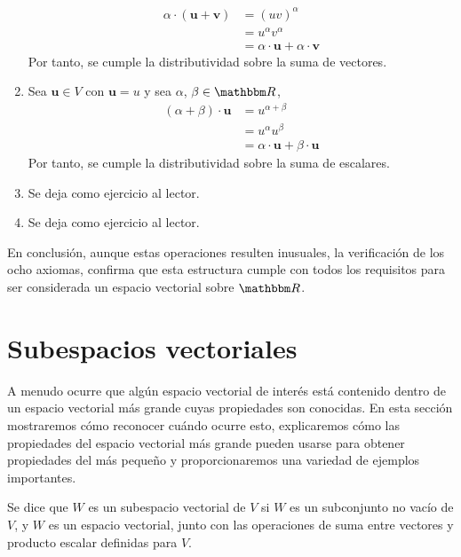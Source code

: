 \begin{examplebox}{}{}
\begin{enumerate}[label=\roman*), topsep=6pt, itemsep=0pt]
\begin{align*}
            \alpha \cdot (\mathbf{u} + \mathbf{v}) & = (uv)^{\alpha} \\
            & = u^{\alpha} v^{\alpha} \\
            & = \alpha \cdot \mathbf{u} + \alpha \cdot \mathbf{v}
        \end{align*}
        Por tanto, se cumple la distributividad sobre la suma de vectores.
        \item Sea $\mathbf{u} \in V$ con $\mathbf{u} = u$ y sea $\alpha$, $\beta \in \RR$,
        \begin{align*}
            (\alpha + \beta) \cdot \mathbf{u} & = u^{\alpha + \beta} \\
            & = u^{\alpha} u^{\beta} \\
            & = \alpha \cdot \mathbf{u} + \beta \cdot \mathbf{u}
        \end{align*}
        Por tanto, se cumple la distributividad sobre la suma de escalares.
        \item Se deja como ejercicio al lector.
        \item Se deja como ejercicio al lector.
    \end{enumerate}
    En conclusión, aunque estas operaciones resulten inusuales, la verificación de los ocho axiomas, confirma que esta estructura cumple con todos los requisitos para ser considerada un espacio vectorial sobre $\RR$.
\end{examplebox}

\newpage

\section{Subespacios vectoriales}

A menudo ocurre que algún espacio vectorial de interés está contenido dentro de un espacio vectorial más grande cuyas propiedades son conocidas. En esta sección mostraremos cómo reconocer cuándo ocurre esto, explicaremos cómo las propiedades del espacio vectorial más grande pueden usarse para obtener propiedades del más pequeño y proporcionaremos una variedad de ejemplos importantes.

\begin{definicion}{}{}
    Se dice que $W$ es un subespacio vectorial de $V$ si $W$ es un subconjunto no vacío de $V$, y $W$ es un espacio vectorial, junto con las operaciones de suma entre vectores y producto escalar definidas para $V$.
\end{definicion}

